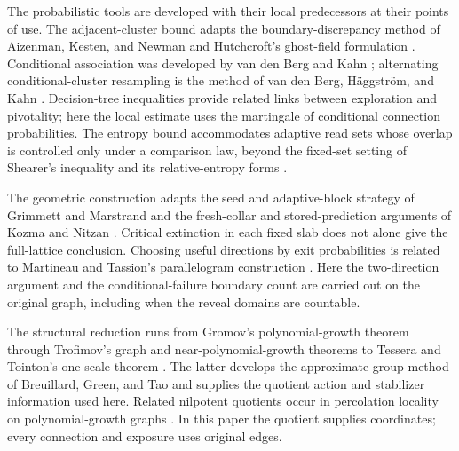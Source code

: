 The probabilistic tools are developed with their local predecessors
at their points of use. The adjacent-cluster bound adapts the
boundary-discrepancy method of Aizenman, Kesten, and Newman
\cite[Section~3]{AizenmanKestenNewman1987} and Hutchcroft's
ghost-field formulation \cite[Section~3]{Hutchcroft2020Locality}.
Conditional association was developed by van den Berg and Kahn
\cite{VanDenBergKahn2001}; alternating conditional-cluster resampling
is the method of van den Berg, H\"aggstr\"om, and Kahn
\cite{VanDenBergHaggstromKahn2006}. Decision-tree inequalities
\cite{OSSS2005,DuminilCopinRaoufiTassion2019} provide related links
between exploration and pivotality; here the local estimate uses
the martingale of conditional connection probabilities. The entropy
bound accommodates adaptive read sets whose overlap is controlled
only under a comparison law, beyond the fixed-set setting of
Shearer's inequality and its relative-entropy forms
\cite{ChungGrahamFranklShearer1986,MadimanTetali2010}.

The geometric construction adapts the seed and adaptive-block
strategy of Grimmett and Marstrand \cite{GrimmettMarstrand1990}
and the fresh-collar and stored-prediction arguments of Kozma and
Nitzan \cite[Lemma~10 and proof of Theorem~6]{KozmaNitzan2024}.
Critical extinction in each fixed slab
\cite{DuminilCopinSidoraviciusTassion2016Slabs} does not alone give
the full-lattice conclusion. Choosing useful directions by exit
probabilities is related to Martineau and Tassion's parallelogram
construction \cite{MartineauTassion2017}. Here the two-direction
argument and the conditional-failure boundary count are carried out
on the original graph, including when the reveal domains are countable.

The structural reduction runs from Gromov's polynomial-growth
theorem \cite{Gromov1981} through Trofimov's graph and
near-polynomial-growth theorems \cite{Trofimov1985,Trofimov2003}
to Tessera and Tointon's one-scale theorem
\cite[Corollary~2.4]{TesseraTointon2021}. The latter develops the
approximate-group method of Breuillard, Green, and Tao
\cite{BreuillardGreenTao2012} and supplies the quotient action and
stabilizer information used here. Related nilpotent quotients occur
in percolation locality on polynomial-growth graphs
\cite{ContrerasMartineauTassion2023Locality}. In this paper the
quotient supplies coordinates; every connection and exposure uses
original edges.
